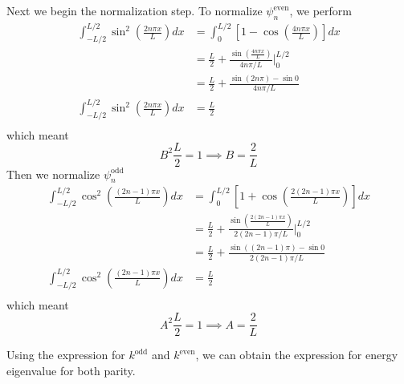\documentclass[../../../main.tex]{subfiles}
\begin{document}
Next we begin the normalization step.
To normalize $\psi_n^{\text{even}}$, we perform
\begin{align*}
  \int_{-L/2}^{L/2} \sin^2\left(\frac{2 n \pi x}{L}\right) dx & =  \int_0^{L/2} \left[1 - \cos\left(\frac{4 n \pi x}{L}\right)\right] dx                 \\
                                                              & = \frac{L }{2 }+ \frac{\sin\left(\frac{4 n \pi x}{L}\right)}{4 n \pi / L} \Bigg|_0^{L/2} \\
                                                              & = \frac{L }{2 }+\frac{\sin(2 n \pi) - \sin 0}{4 n \pi / L}                               \\
  \int_{-L/2}^{L/2} \sin^2\left(\frac{2 n \pi x}{L}\right) dx & =\frac{L }{2}                                                                            \\
\end{align*}
which meant
\begin{equation*}
  B^2 \frac{L }{2 }=1\implies B=\frac{2 }{L}
\end{equation*}
Then we normalize $\psi_n^{\text{odd}}$
\begin{align*}
  \int_{-L/2}^{L/2} \cos^2\left(\frac{(2n-1) \pi x}{L}\right) dx & =  \int_0^{L/2} \left[1 + \cos\left(\frac{2 (2n-1) \pi x}{L}\right)\right] dx                   \\
                                                                 & = \frac{L }{2 }+\frac{\sin\left(\frac{2 (2n-1) \pi x}{L}\right)}{2(2n-1)\pi / L} \Bigg|_0^{L/2} \\
                                                                 & = \frac{L }{2 }+ \frac{\sin((2n-1)\pi)-\sin0}{2(2n-1)\pi / L}                                   \\
  \int_{-L/2}^{L/2} \cos^2\left(\frac{(2n-1) \pi x}{L}\right) dx & = \frac{L }{2 }                                                                                 \\
\end{align*}
which meant
\begin{equation*}
  A^2 \frac{L }{2 }=1\implies A=\frac{2 }{L}
\end{equation*}

Using the expression for $k^{\text{odd}}$ and $k^{\text{even}}$, we can obtain the expression for energy eigenvalue for both parity.
\end{document}
